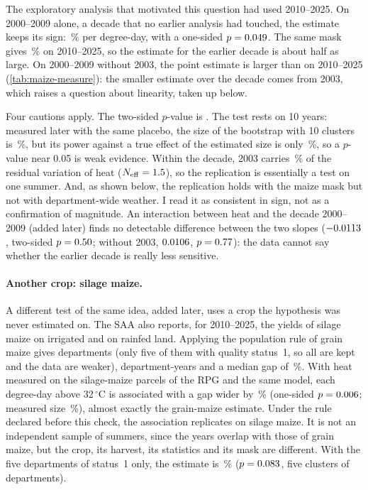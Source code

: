 The exploratory analysis that motivated this question had used 2010--2025. On 2000--2009 alone, a decade that no earlier analysis had touched, the estimate keeps its sign: \QoneReplPct\,\% per degree-day, with a one-sided $p = 0.049$. The same mask gives \QoneRecentPct\,\% on 2010--2025, so the estimate for the earlier decade is about half as large. On 2000--2009 without 2003, the point estimate is larger than on 2010--2025 (\cref{tab:maize-measure}): the smaller estimate over the decade comes from 2003, which raises a question about linearity, taken up below.

Four cautions apply. The two-sided $p$-value is \QoneReplPtwo. The test rests on 10 years: measured later with the same placebo, the size of the bootstrap with 10 clusters is \ReplSize\,\%, but its power against a true effect of the estimated size is only \ReplPower\,\%, so a $p$-value near 0.05 is weak evidence. Within the decade, 2003 carries \LevThreeEarly\,\% of the residual variation of heat ($N_{\mathrm{eff}} = 1.5$), so the replication is essentially a test on one summer. And, as shown below, the replication holds with the maize mask but not with department-wide weather. I read it as consistent in sign, not as a confirmation of magnitude. An interaction between heat and the decade 2000--2009 (added later) finds no detectable difference between the two slopes ($-0.0113$, two-sided $p = 0.50$; without 2003, $0.0106$, $p = 0.77$): the data cannot say whether the earlier decade is really less sensitive.

\paragraph{Another crop: silage maize.} A different test of the same idea, added later, uses a crop the hypothesis was never estimated on. The SAA also reports, for 2010--2025, the yields of silage maize on irrigated and on rainfed land. Applying the population rule of grain maize gives \FodderDeps{} departments (only five of them with quality status~1, so all are kept and the data are weaker), \FodderN{} department-years and a median gap of \FodderGap\,\%. With heat measured on the silage-maize parcels of the RPG and the same model, each degree-day above 32\,$^{\circ}$C is associated with a gap wider by \FodderPct\,\% (one-sided $p = 0.006$; measured size \FodderSize\,\%), almost exactly the grain-maize estimate. Under the rule declared before this check, the association replicates on silage maize. It is not an independent sample of summers, since the years overlap with those of grain maize, but the crop, its harvest, its statistics and its mask are different. With the five departments of status~1 only, the estimate is \FodderSOnePct\,\% ($p = 0.083$, five clusters of departments).

